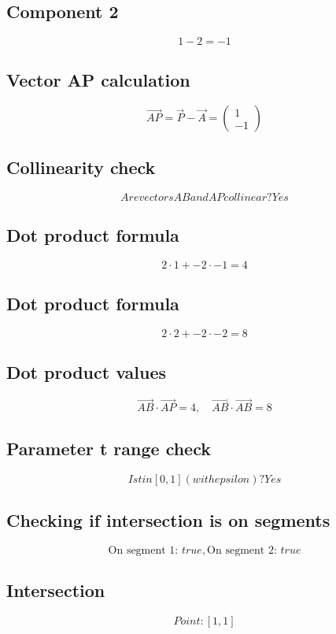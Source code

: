 \documentclass{article}
\begin{document}
\subsection*{ \vspace{1em} Component 2}
\[
1 - 2 = -1
\]
\subsection*{ \vspace{1em} Vector AP calculation}
\[
\vec{AP} = \vec{P} - \vec{A} = \begin{pmatrix}1 \\ -1\end{pmatrix}
\]
\subsection*{ \vspace{1em} Collinearity check}
\[
Are vectors AB and AP collinear? Yes
\]
\subsection*{ \vspace{1em} Dot product formula}
\[
2 \cdot 1 + -2 \cdot -1 = 4
\]
\subsection*{ \vspace{1em} Dot product formula}
\[
2 \cdot 2 + -2 \cdot -2 = 8
\]
\subsection*{ \vspace{1em} Dot product values}
\[
\vec{AB} \cdot \vec{AP} = 4, \quad \vec{AB} \cdot \vec{AB} = 8
\]
\subsection*{ \vspace{1em} Parameter t range check}
\[
Is t in [0,1] (with epsilon)? Yes
\]
\subsection*{ \vspace{1em} Checking if intersection is on segments}
\[
\text{On segment 1: } true, \text{On segment 2: } true
\]
\subsection*{ \vspace{1em} Intersection}
\[
Point: [1, 1]
\]
\bigskip

\hrulefill
\bigskip
\end{document}

